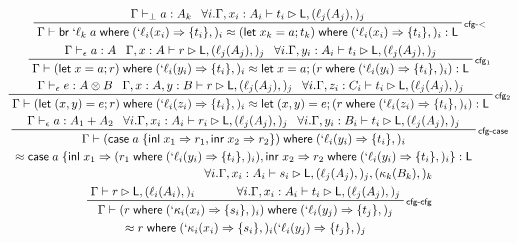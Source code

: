 \documentclass[acmsmall,screen,review]{acmart}
\newcommand{\ms}[1]{\ensuremath{\mathsf{#1}}}
\newcommand{\lbl}[1]{{`#1}}
\newcommand{\lto}{\Rightarrow}
\newcommand{\linl}[1]{\ms{inl}\;{#1}}
\newcommand{\linr}[1]{\ms{inr}\;{#1}}
\newcommand{\letstmt}[3]{\ensuremath{\ms{let}\;#1 = #2; #3}}
\newcommand{\brb}[2]{\ms{br}\;#1\;#2}
\newcommand{\lbrb}[2]{\brb{\lbl{#1}}{#2}}
\newcommand{\casestmt}[5]{\ms{case}\;#1\;\{\linl{#2} \lto #3, \linr{#4} \lto #5\}}
\newcommand{\where}[2]{#1\;\ms{where}\;#2}
\newcommand{\wbranch}[3]{#1(#2) \lto \{#3\}}
\newcommand{\lwbranch}[3]{\wbranch{\lbl{#1}}{#2}{#3}}
\newcommand{\bhyp}[2]{#1 : #2}
\newcommand{\lhyp}[2]{#1(#2)}
\newcommand{\rle}[1]{{\scriptsize\textsf{#1}}}
\newcommand{\hasty}[4]{#1 \vdash_{#2} #3: {#4}}
\newcommand{\haslb}[3]{#1 \vdash #2 \rhd #3}
\newcommand{\teqv}{\approx}
\newcommand{\lbeq}[4]{#1 \vdash #2 \teqv #3 : {#4}}
\begin{document}
\begin{gather*}
    \prftree[r]{\rle{cfg-$<$}}
      {\hasty{\Gamma}{\bot}{a}{A_k}}
      {\forall i. \haslb{\Gamma, \bhyp{x_i}{A_i}}{t_i}{\ms{L}, (\lhyp{\ell_j}{A_j},)_j}}
      {\lbeq{\Gamma}
        {\where{\lbrb{\ell_k}{a}}{(\lwbranch{\ell_i}{x_i}{t_i},)_i}}
        {\where{(\letstmt{x_k}{a}{t_k})}{(\lwbranch{\ell_i}{x_i}{t_i},)_i}}
        {\ms{L}}}
    \\
    \prftree[r]{\rle{cfg$_1$}}
      {\hasty{\Gamma}{\epsilon}{a}{A}}
      {\haslb{\Gamma, \bhyp{x}{A}}{r}{\ms{L}, (\lhyp{\ell_j}{A_j},)_j}}
      {\forall i. \haslb{\Gamma, \bhyp{y_i}{A_i}}{t_i}{\ms{L}, (\lhyp{\ell_j}{A_j},)_j}}
      {\lbeq{\Gamma}
        {\where{(\letstmt{x}{a}{r})}{(\lwbranch{\ell_i}{y_i}{t_i},)_i}}
        {\letstmt{x}{a}{(\where{r}{(\lwbranch{\ell_i}{y_i}{t_i},)_i})}}
        {\ms{L}}}
    \\
    \prftree[r]{\rle{cfg$_2$}}
      {\hasty{\Gamma}{\epsilon}{e}{A \otimes B}}
      {\haslb{\Gamma, \bhyp{x}{A}, \bhyp{y}{B}}{r}{\ms{L}, (\lhyp{\ell_j}{A_j},)_j}}
      {\forall i. \haslb{\Gamma, \bhyp{z_i}{C_i}}{t_i}{\ms{L}, (\lhyp{\ell_j}{A_j},)_j}}
      {\lbeq{\Gamma}
        {\where{(\letstmt{(x, y)}{e}{r})}{(\lwbranch{\ell_i}{z_i}{t_i},)_i}}
        {\letstmt{(x, y)}{e}{(\where{r}{(\lwbranch{\ell_i}{z_i}{t_i},)_i})}}
        {\ms{L}}}
    \\
    \prftree[r]{\rle{cfg-case}}
      {\hasty{\Gamma}{\epsilon}{a}{A_1 + A_2}}
      {\forall i. \haslb{\Gamma, \bhyp{x_i}{A_i}}{r_i}{\ms{L}, (\lhyp{\ell_j}{A_j},)_j}}
      {\forall i. \haslb{\Gamma, \bhyp{y_i}{B_i}}{t_i}{\ms{L}, (\lhyp{\ell_j}{A_j},)_j}}
      {
        \prfStackPremises
        {\Gamma \vdash \where{(\casestmt{a}{x_1}{r_1}{x_2}{r_2})}
          {(\lwbranch{\ell_i}{y_i}{t_i},)_i} }
        {\approx \casestmt{a}
          {x_1}{(\where{r_1}{(\lwbranch{\ell_i}{y_i}{t_i},)_i})}
          {x_2}{\where{r_2}{(\lwbranch{\ell_i}{y_i}{t_i},)_i}} : \ms{L}}
      }
    \\
    \prftree[r]{\rle{cfg-cfg}}
      {\haslb{\Gamma}{r}{\ms{L}, (\lhyp{\ell_i}{A_i},)_i}}
      {
        \prfStackPremises
        {\forall i. \haslb{\Gamma, \bhyp{x_i}{A_i}}
          {s_i}{\ms{L}, (\lhyp{\ell_j}{A_j},)_j, (\lhyp{\kappa_k}{B_k},)_k}}
        {\forall i. \haslb{\Gamma, \bhyp{x_i}{A_i}}{t_i}{\ms{L}, (\lhyp{\ell_j}{A_j},)_j}} 
      }
      {
        \prfStackPremises
        {\Gamma \vdash \where{(\where{r}{(\lwbranch{\kappa_i}{x_i}{s_i},)_i})}
          {(\lwbranch{\ell_i}{y_j}{t_j},)_j}}
        {\approx \where{r}{(\lwbranch{\kappa_i}{x_i}{s_i},)_i(\lwbranch{\ell_i}{y_j}{t_j},)_j} 
}}
\end{gather*}
\end{document}
